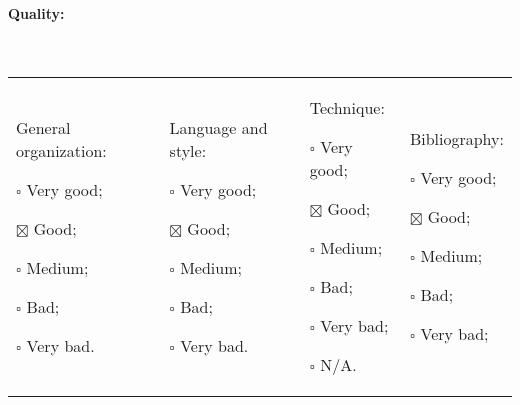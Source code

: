 \documentclass[11pt]{article}
\begin{document}
\paragraph{Quality:} ~\newline
\begin{tabular}{p{}p{}p{}p{}}
\begin{minipage}[t]{.25\textwidth}
General organization:
\begin{description}
\item $\square$ Very good;
\item $\boxtimes$ Good;
\item $\square$ Medium;
\item $\square$ Bad;
\item $\square$ Very bad.
\end{description}
\end{minipage}

&

\begin{minipage}[t]{.25\textwidth}
Language and style:
\begin{description}
\item $\square$ Very good;
\item $\boxtimes$ Good;
\item $\square$ Medium;
\item $\square$ Bad;
\item $\square$ Very bad.
\end{description}
\end{minipage}

&

\begin{minipage}[t]{.25\textwidth}
Technique:
\begin{description}
\item $\square$ Very good;
\item $\boxtimes$ Good;
\item $\square$ Medium;
\item $\square$ Bad;
\item $\square$ Very bad;
\item $\square$ N/A.
\end{description}
\end{minipage}

&

\begin{minipage}[t]{.25\textwidth}
Bibliography:
\begin{description}
\item $\square$ Very good;
\item $\boxtimes$ Good;
\item $\square$ Medium;
\item $\square$ Bad;
\item $\square$ Very bad;
\end{description}
\end{minipage}
\end{tabular}
\end{document}
